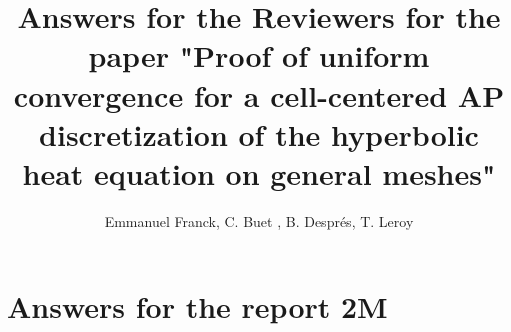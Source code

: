 \documentclass[a4paper,french,english,10pt]{article}
\begin{document}
\title{Answers for the Reviewers  for the paper "Proof of uniform convergence for a cell-centered AP discretization of the hyperbolic heat equation on general meshes"}


\author{Emmanuel Franck\footnotemark[1] \footnotemark[2],
C. Buet \footnotemark[3], 
B. Despr\'es\footnotemark[4], 
T. Leroy\footnotemark[4] \footnotemark[3]
}

\maketitle


\section{Answers for the report 2M}
\end{document}
